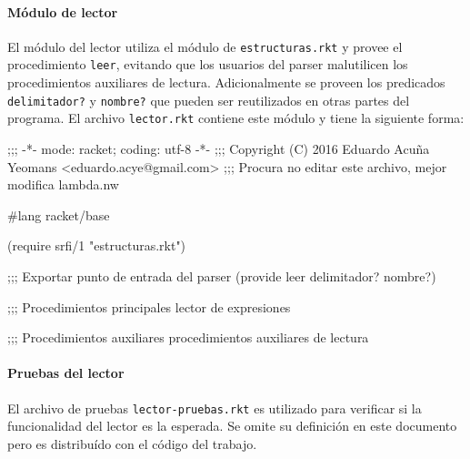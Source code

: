 \documentclass[letterpaper,twoside,openright,11pt]{book}
\begin{document}
\nwenddocs{}\paragraph{Módulo de lector} El módulo del lector utiliza el módulo de {\tt{}estructuras.rkt} y provee el procedimiento {\tt{}\protect{}leer}, evitando que los usuarios del parser malutilicen los procedimientos auxiliares de lectura. Adicionalmente se proveen los predicados {\tt{}\protect{}delimitador?} y {\tt{}\protect{}nombre?} que pueden ser reutilizados en otras partes del programa. El archivo {\tt{}lector.rkt} contiene este módulo y tiene la siguiente forma:

\nwenddocs{}\endmoddef
;;; -*- mode: racket; coding: utf-8 -*-
;;; Copyright (C) 2016 Eduardo Acuña Yeomans <eduardo.acye@gmail.com>
;;; Procura no editar este archivo, mejor modifica lambda.nw

#lang racket/base

(require srfi/1
         "estructuras.rkt")

;;; Exportar punto de entrada del parser
(provide leer
         delimitador? nombre?)

;;; Procedimientos principales
\LA{}lector de expresiones~{\nwtagstyle{}}\RA{}

;;; Procedimientos auxiliares
\LA{}procedimientos auxiliares de lectura~{\nwtagstyle{}}\RA{}
\nwendcode{}\nwdocspar

\nwenddocs{}\paragraph{Pruebas del lector} El archivo de pruebas {\tt{}lector-pruebas.rkt} es utilizado para verificar si la funcionalidad del lector es la esperada. Se omite su definición en este documento pero es distribuído con el código del trabajo.
\end{document}
